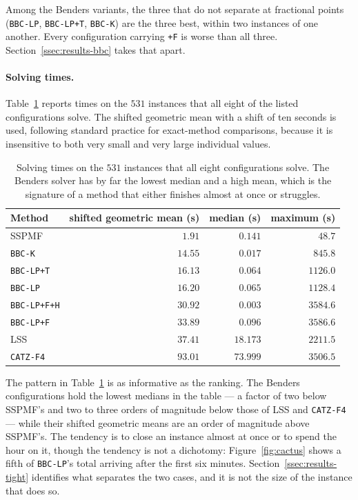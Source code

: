 Among the Benders variants, the three that do not separate at fractional points
(\texttt{BBC-LP}, \texttt{BBC-LP+T}, \texttt{BBC-K}) are the three best, within two
instances of one another. Every configuration carrying \texttt{+F} is worse than all
three. Section~\ref{ssec:results-bbc} takes that apart.

\paragraph{Solving times.}
Table~\ref{tab:times} reports times on the $531$ instances that all eight of the listed
configurations solve. The shifted geometric mean with a shift of ten seconds is used,
following standard practice for exact-method comparisons, because it is insensitive to
both very small and very large individual values.

\begin{table}[h]\centering
\footnotesize
\begin{tabular}{@{}lrrr@{}}
\toprule
Method & shifted geometric mean (s) & median (s) & maximum (s)\\
\midrule
SSPMF              & $1.91$  & $0.141$  & $48.7$\\
\texttt{BBC-K}     & $14.55$ & $0.017$  & $845.8$\\
\texttt{BBC-LP+T}  & $16.13$ & $0.064$  & $1126.0$\\
\texttt{BBC-LP}    & $16.20$ & $0.065$  & $1128.4$\\
\texttt{BBC-LP+F+H}& $30.92$ & $0.003$  & $3584.6$\\
\texttt{BBC-LP+F}  & $33.89$ & $0.096$  & $3586.6$\\
LSS                & $37.41$ & $18.173$ & $2211.5$\\
\texttt{CATZ-F4}   & $93.01$ & $73.999$ & $3506.5$\\
\bottomrule
\end{tabular}
\caption{Solving times on the $531$ instances that all eight configurations solve. The
Benders solver has by far the lowest median and a high mean, which is the signature of
a method that either finishes almost at once or struggles.}
\label{tab:times}
\end{table}

The pattern in Table~\ref{tab:times} is as informative as the ranking. The Benders
configurations hold the lowest medians in the table --- a factor of two below SSPMF's
and two to three orders of magnitude below those of LSS and \texttt{CATZ-F4} --- while
their shifted geometric means are an order of magnitude above SSPMF's. The tendency is
to close an instance almost at once or to spend the hour on it, though the tendency is
not a dichotomy: Figure~\ref{fig:cactus} shows a fifth of \texttt{BBC-LP}'s total
arriving after the first six minutes. Section~\ref{ssec:results-tight} identifies what
separates the two cases, and it is not the size of the instance that does so.

